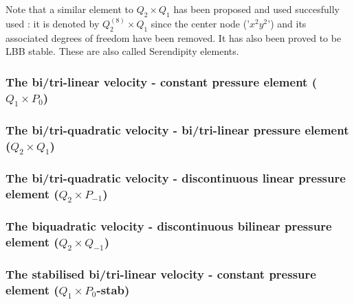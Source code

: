 \begin{remark}
Note that a similar element to $Q_2 \times Q_1$ has been proposed
and used succesfully used \cite{taho73,hota74}: it is denoted by $Q_2^{(8)} \times Q_1$ 
since the center node ('$x^2y^2$') and its associated degrees of freedom have been removed. It 
has also been proved to be LBB stable. These are also called {\color{olive} Serendipity} elements. 
\end{remark}



\subsubsection{The bi/tri-linear velocity - constant pressure element ($Q_1\times P_0$)}
\label{ss:pairq1p0}


\subsubsection{The bi/tri-quadratic velocity - bi/tri-linear pressure element ($Q_2 \times Q_1$)}
\label{ss:pairq2q1}


\subsubsection{The bi/tri-quadratic velocity - discontinuous linear pressure element ($Q_2 \times P_{-1}$)}
\label{ss:pairq2pm1}


\subsubsection{The biquadratic velocity - discontinuous bilinear pressure element ($Q_2 \times Q_{-1}$)}
\label{ss:pair_q2qm1}




\subsubsection{The stabilised bi/tri-linear velocity - constant pressure element ($Q_1\times P_0$-stab)}
\label{ss:pairq1p0stab}



